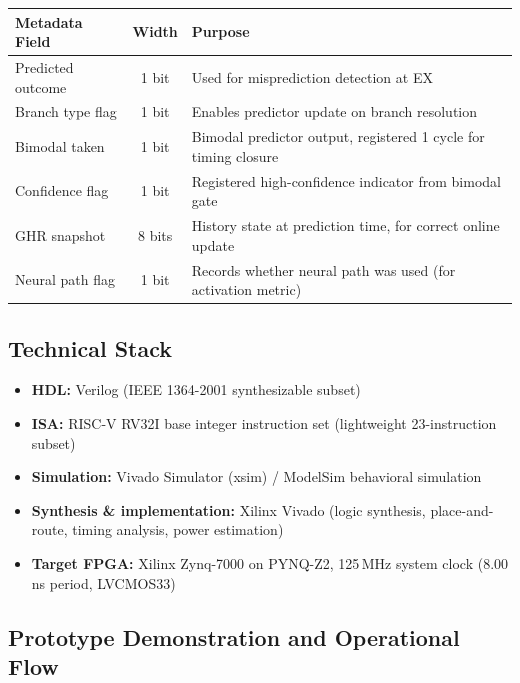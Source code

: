 \documentclass[12pt,a4paper]{article}
\begin{document}
\begin{center}
\renewcommand{\arraystretch}{1.3}
\begin{tabularx}{\linewidth}{p{3.0cm}cX}
\toprule
\textbf{Metadata Field} & \textbf{Width} & \textbf{Purpose} \\
\midrule
Predicted outcome     & 1 bit  & Used for misprediction detection at EX \\
Branch type flag      & 1 bit  & Enables predictor update on branch resolution \\
Bimodal taken         & 1 bit  & Bimodal predictor output, registered 1 cycle for timing closure \\
Confidence flag       & 1 bit  & Registered high-confidence indicator from bimodal gate \\
GHR snapshot          & 8 bits & History state at prediction time, for correct online update \\
Neural path flag      & 1 bit  & Records whether neural path was used (for activation metric) \\
\bottomrule
\end{tabularx}
\end{center}

\subsection{Technical Stack}
\label{sec:techstack}

\begin{itemize}
  \item \textbf{HDL:} Verilog (IEEE 1364-2001 synthesizable subset)~\cite{palnitkar2003verilog}
  \item \textbf{ISA:} RISC-V RV32I base integer instruction set (lightweight 23-instruction subset)~\cite{waterman2016riscv}
  \item \textbf{Simulation:} Vivado Simulator (xsim) / ModelSim behavioral simulation
  \item \textbf{Synthesis \& implementation:} Xilinx Vivado (logic synthesis,
    place-and-route, timing analysis, power estimation)
  \item \textbf{Target FPGA:} Xilinx Zynq-7000 on PYNQ-Z2, 125\,MHz system clock
    (8.00\,ns period, LVCMOS33)
\end{itemize}

\subsection{Prototype Demonstration and Operational Flow}
\label{sec:demo}
\end{document}
